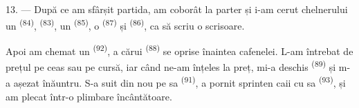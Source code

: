 13. --- După ce am sfârșit partida, am coborât la parter și i-am cerut chelnerului
un  \textsuperscript{(84)},  \textsuperscript{(83)}, un
 \textsuperscript{(85)}, o  \textsuperscript{(87)} și
 \textsuperscript{(86)}, ca să scriu o scrisoare.

Apoi am chemat un  \textsuperscript{(92)}, a cărui 
\textsuperscript{(88)} se oprise înaintea cafenelei. L-am întrebat de prețul pe
ceas sau pe cursă, iar când ne-am înțeles la preț, mi-a deschis 
\textsuperscript{(89)} și m-a așezat înăuntru. S-a suit din nou pe 
sa \textsuperscript{(91)}, a pornit sprinten caii cu  sa
\textsuperscript{(93)}, și am plecat într-o plimbare încântătoare.
\VUsaut{6.0mm}
\VUfilet{22mm}

